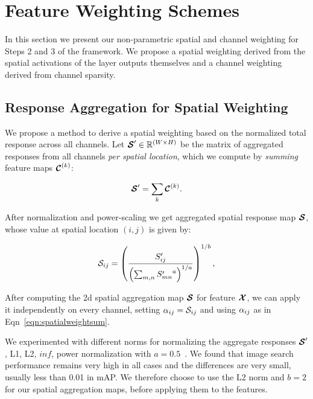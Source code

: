 \documentclass[runningheads]{llncs}
\begin{document}
 





 \section{Feature Weighting Schemes}
\label{sec:weighting}

\noindent
In this section we present our non-parametric spatial and channel weighting for Steps 2 and 3 of the framework. We propose a spatial weighting derived from the spatial activations of the layer outputs themselves and a channel weighting derived from channel sparsity.




\subsection{Response Aggregation for Spatial Weighting}
\label{subsec:spam}


We propose a method to derive a spatial weighting based on the normalized total response across all channels. Let $\bm{\mathcal{S}}^\prime \in \mathbb{R}^{(W \times H)}$ be the matrix of aggregated responses from all channels\textit{ per spatial location}, which we compute by \textit{summing} feature maps $\bm{\mathcal{C}}^{(k)}$: 



\begin{equation}
\bm{\mathcal{S}}^\prime = \sum_{k} \bm{\mathcal{C}}^{(k)}.
\end{equation}


After normalization and power-scaling we get aggregated spatial response map $\bm{\mathcal{S}}$, whose value at spatial location $(i,j)$ is given by:

\begin{equation}
\mathcal{S}_{ij} =   \left (  \frac{S_{ij}^\prime}{ \left ( \sum_{m,n} {S_{mn}^\prime}^a \right ) ^{1/a} } \right ) ^{1/b},
\end{equation}


After computing the 2d spatial aggregation map $\bm{\mathcal{S}}$ for feature $\bm{\mathcal{X}}$, we can apply it independently on every channel, setting $\alpha_{ij} = \mathcal{S}_{ij}$ and using $\alpha_{ij}$ as in Eqn~\ref{eqn:spatialweightsum}.









We experimented with different norms for normalizing the aggregate responses $\bm{\mathcal{S}}^\prime$, \ie L1, L2, $\textit{inf}$, power normalization with $a = 0.5$~\cite{PeSM10}. We found that image search performance remains very high in all cases and the differences are very small, usually less than 0.01 in mAP. We therefore choose to use the L2 norm and $b=2$ for our spatial aggregation maps, before applying them to the features.
\end{document}
